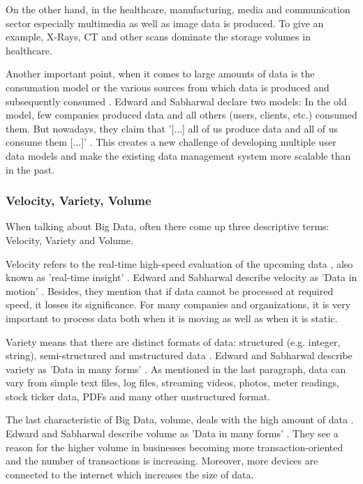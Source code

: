 On the other hand, in the healthcare, manufacturing, media and communication sector especially multimedia as well as image data is produced. To give an example, X-Rays, CT and other scans dominate the storage volumes in healthcare. 

Another important point, when it comes to large amounts of data is the consumation model or the various sources from which data is produced and subsequently consumed \cite[p.6 ff.]{mongodb_edward}. Edward and Sabharwal declare two models: In the old model, few companies produced data and all others (users, clients, etc.) consumed them. But nowadays, they claim that '[...] all of us produce data and all of us consume them [...]' \cite[p.6 ff.]{mongodb_edward}. This creates a new challenge of developing multiple user data models and make the existing data management system more scalable than in the past. 

\subsubsection{Velocity, Variety, Volume}

When talking about Big Data, often there come up three descriptive terms: Velocity, Variety and Volume.

Velocity refers to the real-time high-speed evaluation of the upcoming data \cite{nosql_meier},  also known as 'real-time insight' \cite{mongodb_edward}. Edward and Sabharwal describe velocity as 'Data in motion' \cite[p.7 ff.]{mongodb_edward}. Besides, they mention that if data cannot be processed at required speed, it losses its significance. For many companies and organizations, it is very important to process data both when it is moving as well as when it is static. 

Variety means that there are distinct formats of data: structured (e.g. integer, string), semi-structured and unstructured data \cite{nosql_meier}. Edward and Sabharwal describe variety as 'Data in many forms' \cite[p.7 ff.]{mongodb_edward}. As mentioned in the last paragraph, data can vary from simple text files, log files, streaming videos, photos, meter readings, stock ticker data, PDFs and many other unstructured format.   

The last characteristic of Big Data, volume, deals with the high amount of data \cite{nosql_meier}. Edward and Sabharwal describe volume as 'Data in many forms' \cite[p.7 ff.]{mongodb_edward}. They see a reason for the higher volume in businesses becoming more transaction-oriented and the number of transactions is increasing. Moreover, more devices are connected to the internet which increases the size of data.

